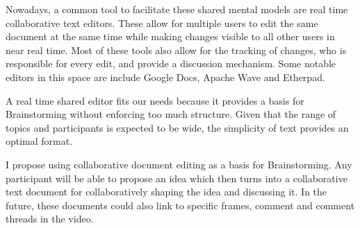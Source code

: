 Nowadays, a common tool to facilitate these shared mental models are real time collaborative text editors. These allow for multiple users to edit the same document at the same time while making changes visible to all other users in near real time. Most of these tools also allow for the tracking of changes, who is responsible for every edit, and provide a discussion mechanism. Some notable editors in this space are include Google Docs\cite{gdocs}, Apache Wave\cite{wave} and Etherpad\cite{etherpad}. 

A real time shared editor fits our needs because it provides a basis for Brainstorming without enforcing too much structure. Given that the range of topics and participants is expected to be wide, the simplicity of text provides an optimal format. 

I propose using collaborative document editing as a basis for Brainstorming. Any participant will be able to propose an idea which then turns into a collaborative text document for collaboratively shaping the idea and discussing it. In the future, these documents could also link to specific frames, comment and comment threads in the video. 